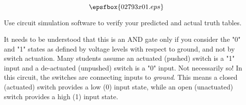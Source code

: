 

$$\epsfbox{02793x01.eps}$$

\vfil \eject






Use circuit simulation software to verify your predicted and actual truth tables.







It needs to be understood that this is an AND gate only if you consider the "0" and "1" states as defined by voltage levels with respect to ground, and not by switch actuation.  Many students assume an actuated (pushed) switch is a "1" input and a de-actuated (unpushed) switch is a "0" input.  Not necessarily so!  In this circuit, the switches are connecting inputs to {\it ground}.  This means a closed (actuated) switch provides a low (0) input state, while an open (unactuated) switch provides a high (1) input state.




